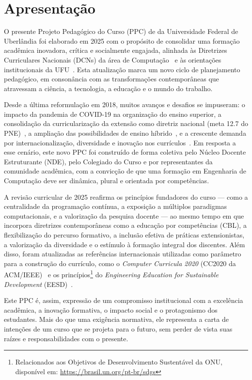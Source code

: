 \chapter{Apresentação}

O presente Projeto Pedagógico do Curso (PPC) de \nomecursonovo da Universidade Federal de Uberlândia foi elaborado em 2025 com o propósito de consolidar uma formação acadêmica inovadora, crítica e socialmente engajada, alinhada às Diretrizes Curriculares Nacionais (DCNs) da área de Computação~\cite{MEC:CNE:CES:5:2016} e às orientações institucionais da UFU~\cite{UFU:CONGRAD:15:2016,UFU:GuiaPPC:2021}. Esta atualização marca um novo ciclo de planejamento pedagógico, em consonância com as transformações contemporâneas que atravessam a ciência, a tecnologia, a educação e o mundo do trabalho.

Desde a última reformulação em 2018, muitos avanços e desafios se impuseram: o impacto da pandemia de COVID-19 na organização do ensino superior, a consolidação da curricularização da extensão como diretriz nacional (meta 12.7 do PNE)~\cite{mec2014pne,UFU:CONSUN:25:2019,UFU:CONGRAD:13:2019,UFU:CONSEX:5:2020}, a ampliação das possibilidades de ensino híbrido~\cite{Decreto:12456:2025}, e a crescente demanda por internacionalização, diversidade e inovação nos currículos~\cite{UFU:CONSUN:31:2022}. Em resposta a esse cenário, este novo PPC foi construído de forma coletiva pelo Núcleo Docente Estruturante (NDE), pelo Colegiado do Curso e por representantes da comunidade acadêmica, com a convicção de que uma formação em Engenharia de Computação deve ser dinâmica, plural e orientada por competências.

A revisão curricular de 2025 reafirma os princípios fundadores do curso — como a centralidade da programação contínua, a exposição a múltiplos paradigmas computacionais, e a valorização da pesquisa docente — ao mesmo tempo em que incorpora diretrizes contemporâneas como a educação por competências (CBL), a flexibilização do percurso formativo, a inclusão efetiva de práticas extensionistas, a valorização da diversidade e o estímulo à formação integral dos discentes. Além disso, foram atualizadas as referências internacionais utilizadas como parâmetro para a construção do currículo, como o \textit{Computer Curricula 2020} (CC2020 da ACM/IEEE)~\cite{ACM:CC2020} e os princípios\footnote{Relacionados aos Objetivos de Desenvolvimento Sustentável da ONU, disponível em: \url{https://brasil.un.org/pt-br/sdgs}} do \textit{Engineering Education for Sustainable Development} (EESD)~\cite{UNESCO:Eng4SusDev:2021}.

Este PPC é, assim, expressão de um compromisso institucional com a excelência acadêmica, a inovação formativa, o impacto social e o protagonismo dos estudantes. Mais do que uma exigência normativa, ele representa a carta de intenções de um curso que se projeta para o futuro, sem perder de vista suas raízes e responsabilidades com o presente.